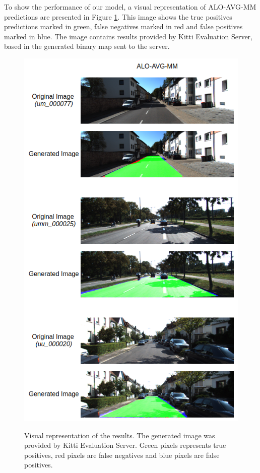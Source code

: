 

To show the performance of our model, a visual representation of ALO-AVG-MM predictions are presented in Figure \ref{fig:visual_representation}. This image shows the true positives predictions marked in green, false negatives marked in  red and false positives marked in blue. The image contains results provided by Kitti Evaluation Server, based in the generated binary map sent to the server.

\begin{figure}
  \caption{Visual representation of the results. The generated image was provided by Kitti Evaluation Server. Green pixels represents true positives, red pixels are false negatives and blue pixels are false positives.}
  \centering
  \includegraphics[width=1.\columnwidth]{figures/falreis/visual_representation.png}
  \label{fig:visual_representation}
\end{figure}
